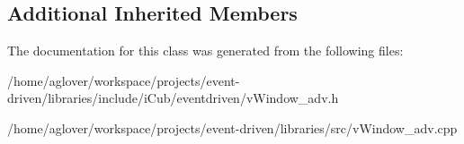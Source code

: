 \subsection*{Additional Inherited Members}


The documentation for this class was generated from the following files\+:\begin{DoxyCompactItemize}
\item 
/home/aglover/workspace/projects/event-\/driven/libraries/include/i\+Cub/eventdriven/v\+Window\+\_\+adv.\+h\item 
/home/aglover/workspace/projects/event-\/driven/libraries/src/v\+Window\+\_\+adv.\+cpp\end{DoxyCompactItemize}
